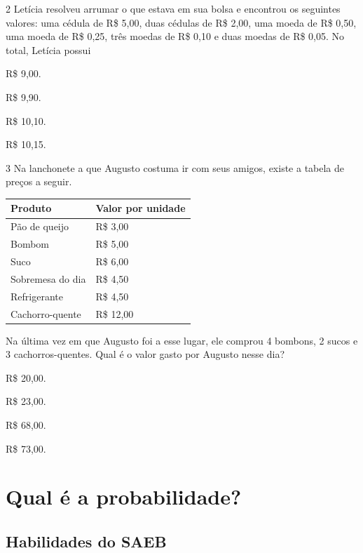 \num{2} Letícia resolveu arrumar o que estava em sua bolsa e encontrou
os seguintes valores: uma cédula de R\$ 5,00, duas cédulas de R\$ 2,00, uma moeda de R\$ 0,50, uma moeda de R\$ 0,25, três moedas de R\$ 0,10 e duas moedas de R\$ 0,05. No total, Letícia possui

\begin{escolha}
\begin{multicols}{2}
\item
  R\$ 9,00.
\item
  R\$ 9,90.
\item
  R\$ 10,10.
\item
  R\$ 10,15.
\end{multicols}
\end{escolha}

\num{3} Na lanchonete a que Augusto costuma ir com seus amigos, existe a tabela de preços a seguir.

\begin{longtable}[]{@{}ll@{}}
\toprule
Produto & Valor por unidade\tabularnewline
\midrule
\endhead
Pão de queijo & R\$ 3,00\tabularnewline
Bombom & R\$ 5,00\tabularnewline
Suco & R\$ 6,00\tabularnewline
Sobremesa do dia & R\$ 4,50\tabularnewline
Refrigerante & R\$ 4,50\tabularnewline
Cachorro-quente & R\$ 12,00\tabularnewline
\bottomrule
\end{longtable}

Na última vez em que Augusto foi a esse lugar, ele comprou 4 bombons, 2
sucos e 3 cachorros-quentes. Qual é o valor gasto por Augusto nesse dia?

\begin{escolha}
\begin{multicols}{2}
\item
  R\$ 20,00.
\item
  R\$ 23,00.
\item
  R\$ 68,00.
\item
  R\$ 73,00.
\end{multicols}
\end{escolha}


\chapter{Qual é a probabilidade?}

\section*{Habilidades do SAEB}

